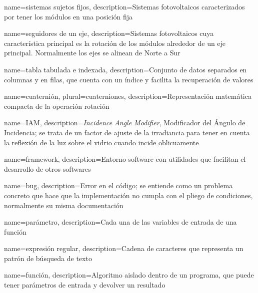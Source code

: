 {
    name={sistemas sujetos fijos},
    description={Sistemas fotovoltaicos caracterizados por tener los módulos en una posición fija}
}

{
    name={seguidores de un eje},
    description={Sistemas fotovoltaicos cuya característica principal es la rotación de los módulos alrededor de un eje principal. Normalmente los ejes se alinean de Norte a Sur}
}

{
    name={tabla tabulada e indexada},
    description={Conjunto de datos separados en columnas y en filas, que cuenta con un índice y facilita la recuperación de valores}
}

{
    name={cuaternión},
    plural={cuaterniones},
    description={Representación matemática compacta de la operación rotación}
}

{
    name={IAM},
    description={\textit{Incidence Angle Modifier}, Modificador del Ángulo de Incidencia; se trata de un factor de ajuste de la irradiancia para tener en cuenta la reflexión de la luz sobre el vidrio cuando incide oblicuamente}
}

{
    name={framework},
    description={Entorno \gls{software} con utilidades que facilitan el desarrollo de otros softwares}
}

{
    name={bug},
    description={Error en el código; se entiende como un problema concreto que hace que la implementación no cumpla con el pliego de condiciones, normalmente su misma \gls{documentación}}
}

{
    name={parámetro},
    description={Cada una de las variables de entrada de una función}
}

{
    name={expresión regular},
    description={Cadena de caracteres que representa un patrón de búsqueda de texto}
}

{
    name={función},
    description={Algoritmo aislado dentro de un programa, que puede tener parámetros de entrada y devolver un resultado}
}


